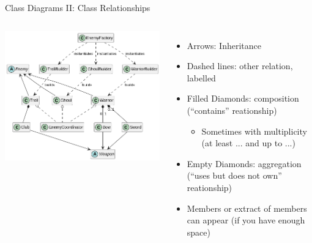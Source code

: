 \begin{frame}{Class Diagrams II: Class Relationships}
%
\begin{columns}
\includegraphics[width=\linewidth]{./gfx/15-uml-big}
%
\begin{itemize}
\item Arrows: Inheritance
\item Dashed lines: other relation, labelled
\item Filled Diamonds: composition (\enquote{contains} reationship)
	\begin{itemize}
	\item Sometimes with multiplicity (at least ... and up to ...)
	\end{itemize}
\item Empty Diamonds: aggregation (\enquote{uses but does not own} reationship)
\item Members or extract of members can appear (if you have enough space)
\end{itemize}
\end{columns}
%
\end{frame}


